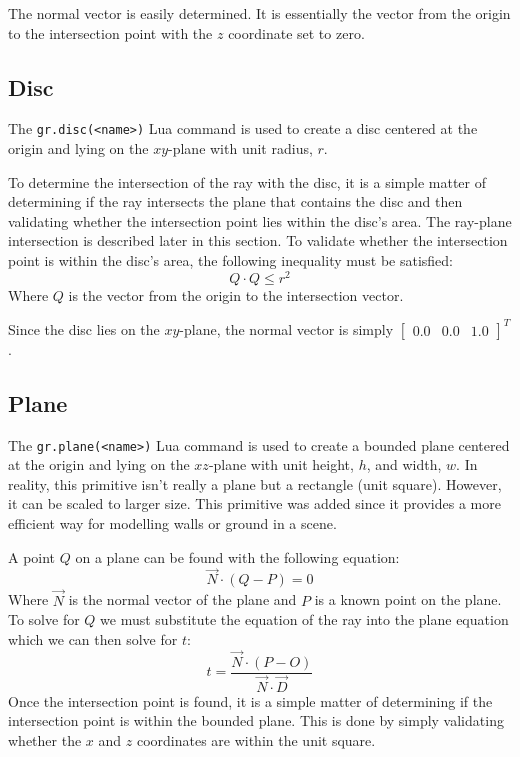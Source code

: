 The normal vector is easily determined. It is essentially the vector from the
origin to the intersection point with the $z$ coordinate set to zero.

\subsection*{Disc}
The \verb|gr.disc(<name>)| Lua command is used to create a disc centered at the
origin and lying on the $xy$-plane with unit radius, $r$.

To determine the intersection of the ray with the disc, it is a simple matter of
determining if the ray intersects the plane that contains the disc and then
validating whether the intersection point lies within the disc's area. The
ray-plane intersection is described later in this section. To validate whether
the intersection point is within the disc's area, the following inequality must
be satisfied:
\begin{equation}
  Q\cdot Q \leq r^2
\end{equation}
Where $Q$ is the vector from the origin to the intersection vector.

Since the disc lies on the $xy$-plane, the normal vector is simply \newline
$\begin{bmatrix} 0.0 & 0.0 & 1.0
\end{bmatrix}^{T}$.

\subsection*{Plane}
The \verb|gr.plane(<name>)| Lua command is used to create a bounded plane 
centered at the origin and lying on the $xz$-plane with unit height, $h$, and 
width, $w$. In reality, this primitive isn't really a plane but a rectangle
(unit square). However, it can be scaled to larger size. This primitive was
added since it provides a more efficient way for modelling walls or ground in a
scene.

A point $Q$ on a plane can be found with the following equation:
\begin{equation}
  \vec{N}\cdot (Q - P) = 0
\end{equation}
Where $\vec{N}$ is the normal vector of the plane and $P$ is a known point on
the plane. To solve for $Q$ we must substitute the equation of the ray into the
plane equation which we can then solve for $t$:
\begin{equation}
  t = \frac{\vec{N}\cdot (P - O)}{\vec{N}\cdot \vec{D}}
\end{equation}
Once the intersection point is found, it is a simple matter of determining if
the intersection point is within the bounded plane. This is done by simply
validating whether the $x$ and $z$ coordinates are within the unit square.

